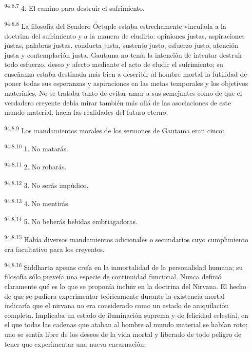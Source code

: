\par
\textsuperscript{94:8.7} 4. El camino para destruir el sufrimiento.

\par
\textsuperscript{94:8.8} La filosofía del Sendero Óctuple estaba estrechamente vinculada a la doctrina del sufrimiento y a la manera de eludirlo: opiniones justas, aspiraciones justas, palabras justas, conducta justa, sustento justo, esfuerzo justo, atención justa y contemplación justa. Gautama no tenía la intención de intentar destruir todo esfuerzo, deseo y afecto mediante el acto de eludir el sufrimiento; su enseñanza estaba destinada más bien a describir al hombre mortal la futilidad de poner todas sus esperanzas y aspiraciones en las metas temporales y los objetivos materiales. No se trataba tanto de evitar amar a sus semejantes como de que el verdadero creyente debía mirar también más allá de las asociaciones de este mundo material, hacia las realidades del futuro eterno.

\par
\textsuperscript{94:8.9} Los mandamientos morales de los sermones de Gautama eran cinco:

\par
\textsuperscript{94:8.10} 1. No matarás.

\par
\textsuperscript{94:8.11} 2. No robarás.

\par
\textsuperscript{94:8.12} 3. No serás impúdico.

\par
\textsuperscript{94:8.13} 4. No mentirás.

\par
\textsuperscript{94:8.14} 5. No beberás bebidas embriagadoras.

\par
\textsuperscript{94:8.15} Había diversos mandamientos adicionales o secundarios cuyo cumplimiento era facultativo para los creyentes.

\par
\textsuperscript{94:8.16} Siddharta apenas creía en la inmortalidad de la personalidad humana; su filosofía sólo preveía una especie de continuidad funcional. Nunca definió claramente qué es lo que se proponía incluir en la doctrina del Nirvana. El hecho de que se pudiera experimentar teóricamente durante la existencia mortal indicaría que el nirvana no era considerado como un estado de aniquilación completa. Implicaba un estado de iluminación suprema y de felicidad celestial, en el que todas las cadenas que ataban al hombre al mundo material se habían roto; uno se sentía libre de los deseos de la vida mortal y liberado de todo peligro de tener que experimentar una nueva encarnación.

